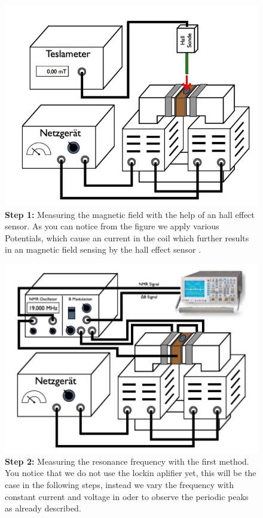 \begin{figure}[htpb]
    \centering
    \includegraphics[width=0.8\linewidth]{figures/setup1}
    \caption{\textbf{Step 1:} Measuring the magnetic field with the help of 
       an hall effect sensor. As you can notice from the figure we 
      apply various Potentials, which cause an current in the coil which
      further results in an magnetic field sensing by the hall effect sensor \cite{versuchsanleitung}.}
    \label{fig:figures/setup1}
\end{figure}
\begin{figure}[htpb]
    \centering
    \includegraphics[width=0.8\linewidth]{figures/setup2}
    \caption{\textbf{Step 2:} Measuring the resonance frequency with the first
        method. You notice that we do not use the lockin aplifier yet,
        this will be the case in the following steps, instead we vary the
        frequency with constant current and voltage in oder to observe
        the periodic peaks as already described.}
    \label{fig:figures/setup1}
\end{figure}
